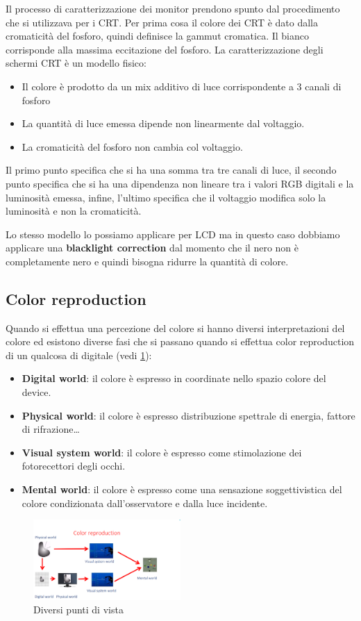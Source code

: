 Il processo di caratterizzazione dei monitor prendono spunto dal procedimento che si
utilizzava per i CRT. Per prima cosa il colore dei CRT è dato dalla cromaticità
del fosforo, quindi definisce la gammut cromatica. Il bianco corrisponde
alla massima eccitazione del fosforo. La caratterizzazione degli schermi CRT è un
modello fisico:
\begin{itemize}
    \item Il colore è prodotto da un mix additivo di luce corrispondente a 3 canali
          di fosforo
    \item La quantità di luce emessa dipende non linearmente dal voltaggio.
    \item La cromaticità del fosforo non cambia col voltaggio.
\end{itemize}

Il primo punto specifica che si ha una somma tra tre canali di luce, il secondo
punto specifica che si ha una dipendenza non lineare tra i valori RGB digitali e
la luminosità emessa, infine, l'ultimo specifica che il voltaggio modifica solo
la luminosità e non la cromaticità.

Lo stesso modello lo possiamo applicare per LCD ma in questo caso dobbiamo applicare
una \textbf{blacklight correction} dal momento che il nero non è completamente nero
e quindi bisogna ridurre la quantità di colore.

\subsection{Color reproduction}
Quando si effettua una percezione del colore si hanno diversi interpretazioni
del colore ed esistono diverse fasi che si passano quando si effettua color reproduction
di un qualcosa di digitale (vedi \ref{fig:significato_colore}):
\begin{itemize}
    \item \textbf{Digital world}: il colore è espresso in coordinate nello
          spazio colore del device.
    \item \textbf{Physical world}: il colore è espresso distribuzione spettrale
          di energia, fattore di rifrazione\dots
    \item \textbf{Visual system world}: il colore è espresso come stimolazione
          dei fotorecettori degli occhi.
    \item \textbf{Mental world}: il colore è espresso come una sensazione
          soggettivistica del colore condizionata dall'osservatore e dalla luce
          incidente.
\end{itemize}
\begin{figure}[!ht]
    \centering
    \includegraphics[width=0.5\textwidth]{img/descrizione_colore.png}
    \caption{Diversi punti di vista}
    \label{fig:significato_colore}
\end{figure}

